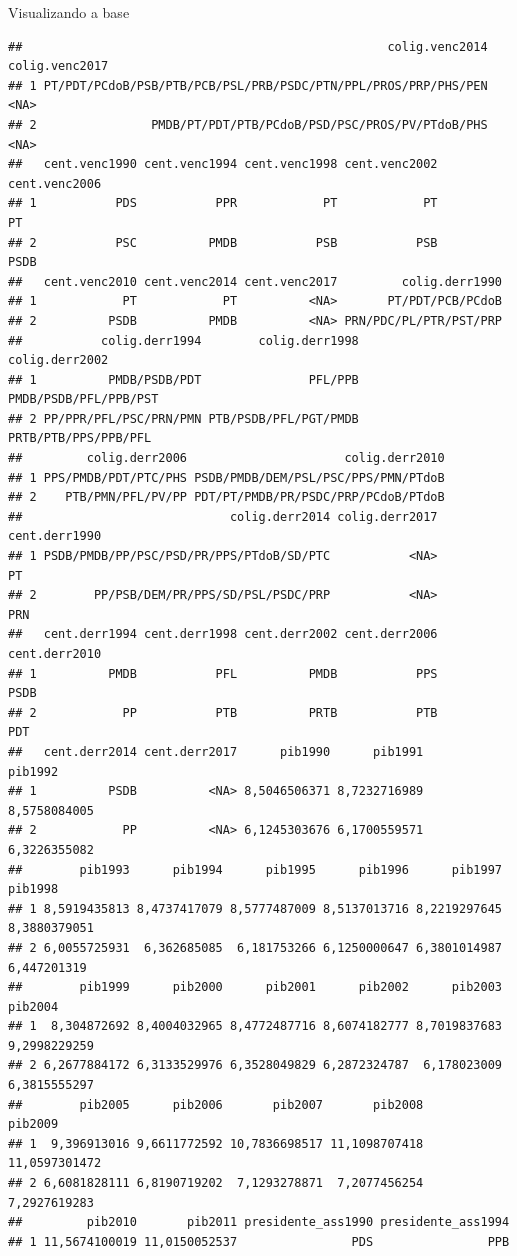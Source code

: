 \documentclass[
  10pt,
  ignorenonframetext,
]{beamer}
\begin{document}
\begin{frame}[fragile]{Visualizando a base}
\begin{verbatim}
##                                                   colig.venc2014 colig.venc2017
## 1 PT/PDT/PCdoB/PSB/PTB/PCB/PSL/PRB/PSDC/PTN/PPL/PROS/PRP/PHS/PEN           <NA>
## 2                PMDB/PT/PDT/PTB/PCdoB/PSD/PSC/PROS/PV/PTdoB/PHS           <NA>
##   cent.venc1990 cent.venc1994 cent.venc1998 cent.venc2002 cent.venc2006
## 1           PDS           PPR            PT            PT            PT
## 2           PSC          PMDB           PSB           PSB          PSDB
##   cent.venc2010 cent.venc2014 cent.venc2017         colig.derr1990
## 1            PT            PT          <NA>       PT/PDT/PCB/PCdoB
## 2          PSDB          PMDB          <NA> PRN/PDC/PL/PTR/PST/PRP
##           colig.derr1994        colig.derr1998        colig.derr2002
## 1          PMDB/PSDB/PDT               PFL/PPB PMDB/PSDB/PFL/PPB/PST
## 2 PP/PPR/PFL/PSC/PRN/PMN PTB/PSDB/PFL/PGT/PMDB  PRTB/PTB/PPS/PPB/PFL
##         colig.derr2006                      colig.derr2010
## 1 PPS/PMDB/PDT/PTC/PHS PSDB/PMDB/DEM/PSL/PSC/PPS/PMN/PTdoB
## 2    PTB/PMN/PFL/PV/PP PDT/PT/PMDB/PR/PSDC/PRP/PCdoB/PTdoB
##                             colig.derr2014 colig.derr2017 cent.derr1990
## 1 PSDB/PMDB/PP/PSC/PSD/PR/PPS/PTdoB/SD/PTC           <NA>            PT
## 2        PP/PSB/DEM/PR/PPS/SD/PSL/PSDC/PRP           <NA>           PRN
##   cent.derr1994 cent.derr1998 cent.derr2002 cent.derr2006 cent.derr2010
## 1          PMDB           PFL          PMDB           PPS          PSDB
## 2            PP           PTB          PRTB           PTB           PDT
##   cent.derr2014 cent.derr2017      pib1990      pib1991      pib1992
## 1          PSDB          <NA> 8,5046506371 8,7232716989 8,5758084005
## 2            PP          <NA> 6,1245303676 6,1700559571 6,3226355082
##        pib1993      pib1994      pib1995      pib1996      pib1997      pib1998
## 1 8,5919435813 8,4737417079 8,5777487009 8,5137013716 8,2219297645 8,3880379051
## 2 6,0055725931  6,362685085  6,181753266 6,1250000647 6,3801014987  6,447201319
##        pib1999      pib2000      pib2001      pib2002      pib2003      pib2004
## 1  8,304872692 8,4004032965 8,4772487716 8,6074182777 8,7019837683 9,2998229259
## 2 6,2677884172 6,3133529976 6,3528049829 6,2872324787  6,178023009 6,3815555297
##        pib2005      pib2006       pib2007       pib2008       pib2009
## 1  9,396913016 9,6611772592 10,7836698517 11,1098707418 11,0597301472
## 2 6,6081828111 6,8190719202  7,1293278871  7,2077456254  7,2927619283
##         pib2010       pib2011 presidente_ass1990 presidente_ass1994
## 1 11,5674100019 11,0150052537                PDS                PPB

\end{verbatim}
\end{frame}
\end{document}
